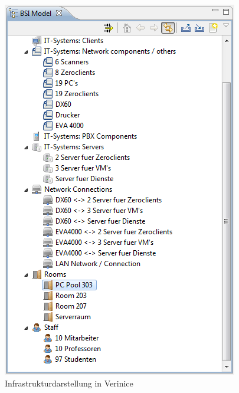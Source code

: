 \begin{figure}[htbp]
	\includegraphics[scale=0.5]{images/verinicestruktur}
	\caption{Infrastrukturdarstellung in Verinice}
	\label{fig:idoitschema}
\end{figure}


